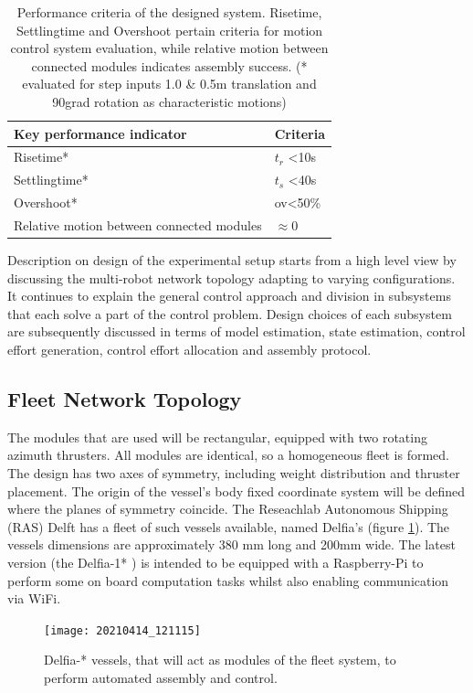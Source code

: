\begin{table}[]
	\centering
	\begin{tabular}{ll}
		Key performance indicator                 & Criteria           \\ \hline
		Risetime*                                 & $t_r$ \textless{}10s      \\
		Settlingtime*                             & $t_s$ \textless{}40s       \\
		Overshoot*                                & ov\textless{}50\%      \\
		Relative motion between connected modules & $\approx 0$      
	\end{tabular}
	\caption{Performance criteria of the designed system. Risetime, Settlingtime and Overshoot pertain criteria for motion control system evaluation, while relative motion between connected modules indicates assembly success. (* evaluated for step inputs 1.0 \& 0.5m translation and 90grad rotation as characteristic motions)}
	\label{tab:KPIS}
\end{table}

Description on design of the experimental setup starts from a high level view by discussing the multi-robot network topology adapting to varying configurations. It continues to explain the general control approach and division in subsystems that each solve a part of the control problem. Design choices of each subsystem are subsequently discussed in terms of model estimation, state estimation, control effort generation, control effort allocation and  assembly protocol. 

\subsection{Fleet Network Topology}
\label{subsection:topologyDesign}
The modules that are used will be rectangular, equipped with two rotating azimuth thrusters. All modules are identical, so a homogeneous fleet is formed. The design has two axes of symmetry, including weight distribution and thruster placement. The origin of the vessel's body fixed coordinate system will be defined where the planes of symmetry coincide. 
The Reseachlab Autonomous Shipping (RAS) Delft has a fleet of such vessels available, named Delfia's (figure \ref{fig:DelfiaOverallLook}). The vessels dimensions are approximately 380 mm long and 200mm wide. The latest version (the Delfia-1* ) is intended to be equipped with a Raspberry-Pi to perform some on board computation tasks whilst also enabling communication via WiFi. 
\begin{figure}[H]
	\centering
	\texttt{[image: 20210414\_121115]}
	\caption{Delfia-* vessels, that will act as modules of the fleet system, to perform automated assembly and control.}
	\label{fig:DelfiaOverallLook}
\end{figure}

